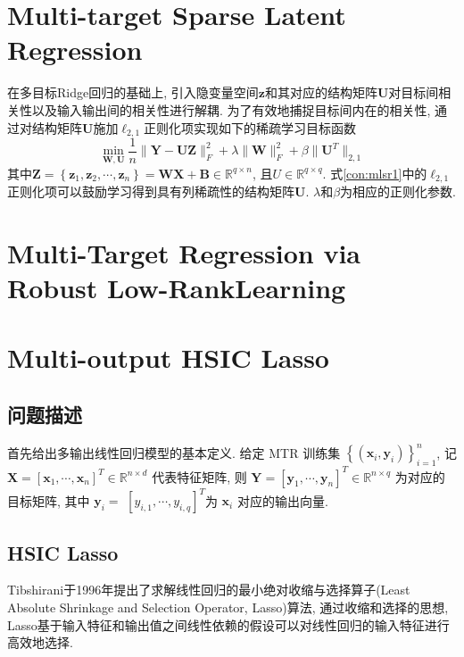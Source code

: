 \documentclass[lang=cn,10pt]{gorgeousnbook}
\numberwithin{equation}{section}%
\numberwithin{figure}{section}%
\begin{document}
\section{Multi-target Sparse Latent Regression}
在多目标Ridge回归的基础上, 引入隐变量空间$\mathbf{z}$和其对应的结构矩阵$\mathbf{U}$对目标间相关性以及输入输出间的相关性进行解耦. 为了有效地捕捉目标间内在的相关性, 通过对结构矩阵$\mathbf{U}$施加$\ell_{2,1}$正则化项实现如下的稀疏学习目标函数
\begin{equation}
\min_{\mathbf{W,U}}\frac{1}{n}\lVert \mathbf{Y}-\mathbf{UZ} \rVert _{F}^{2}+\lambda \lVert \mathbf{W} \rVert _{F}^{2}+\beta \lVert \mathbf{U}^T \rVert _{2,1} \label{con:mlsr1}
\end{equation}
其中$\mathbf{Z}=\left\{ \mathbf{z}_1,\mathbf{z}_2,\cdots ,\mathbf{z}_n \right\} =\mathbf{WX}+\mathbf{B}\in \mathbb{R}^{q\times n}$, 且$U\in \mathbb{R}^{q\times q}$. 式\eqref{con:mlsr1}中的$\ell_{2,1}$正则化项可以鼓励学习得到具有列稀疏性的结构矩阵$\mathbf{U}$. $\lambda$和$\beta$为相应的正则化参数. 

\section{Multi-Target Regression via Robust Low-RankLearning}



\section{Multi-output HSIC Lasso}
\subsection{问题描述}
首先给出多输出线性回归模型的基本定义. 给定 MTR 训练集 $\left\{ \left( \boldsymbol{x}_i,\boldsymbol{y}_i \right) \right\} _{i=1}^{n}$, 记 $\boldsymbol{X}=\left[ \boldsymbol{x}_1,\cdots,\boldsymbol{x}_n \right]^{T} \in \mathbb{R}^{n\times d}$ 代表特征矩阵, 则 $\boldsymbol{Y} =\left[ \boldsymbol{y}_1,\cdots,\boldsymbol{y}_n\right]^{T}\in \mathbb{R}^{n\times q}$ 为对应的目标矩阵, 其中 $\boldsymbol{y}_i=$ $ \left[ y_{i,1},\cdots ,y_{i,q} \right]^T $为 $\boldsymbol{x}_i$ 对应的输出向量.
\subsection{HSIC Lasso}
Tibshirani于1996年提出了求解线性回归的最小绝对收缩与选择算子(Least Absolute Shrinkage and Selection Operator, Lasso)算法, 通过收缩和选择的思想, Lasso基于输入特征和输出值之间线性依赖的假设可以对线性回归的输入特征进行高效地选择.  
\end{document}
